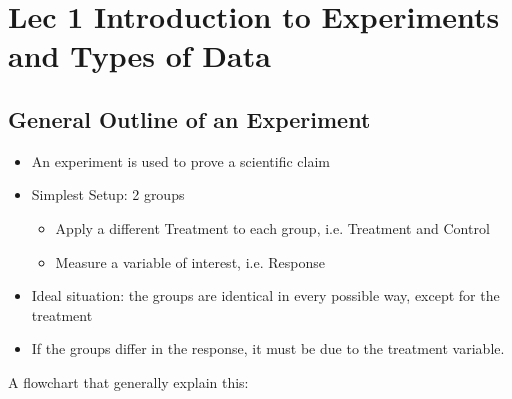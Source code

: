 \documentclass[a4paper,11pt]{article}
\begin{document}
\newpage

\tableofcontents

\newpage

\section{Lec 1 Introduction to Experiments and Types of Data}
\subsection{General Outline of an Experiment}
\begin{itemize}
\item An experiment is used to prove a scientific claim
\item Simplest Setup: 2 groups
\begin{itemize}
\item Apply a different Treatment to each group, i.e. Treatment and Control
\item Measure a variable of interest, i.e. Response
\end{itemize}
\item Ideal situation: the groups are identical in every possible way, except for the treatment
\item If the groups differ in the response, it must be due to the treatment variable. 
\end{itemize}
A flowchart that generally explain this: 

\end{document}
